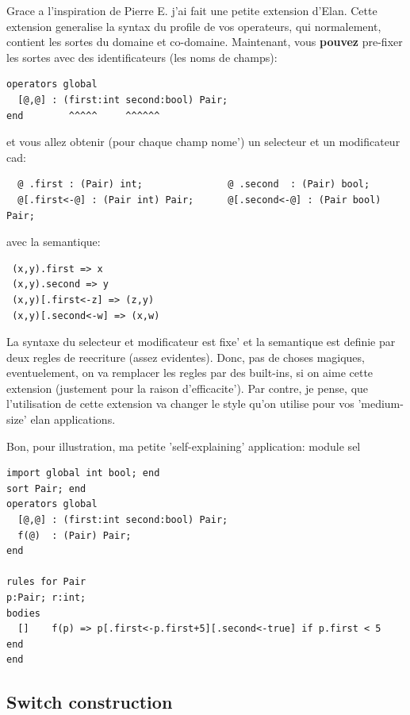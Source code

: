 \documentclass{article}
\begin{document}
{\scriptsize
Grace a l'inspiration de Pierre E. j'ai fait une petite extension d'Elan.
Cette extension generalise la syntax du profile de vos operateurs, qui
normalement, contient les sortes du domaine et co-domaine.
Maintenant, vous {\bf pouvez} pre-fixer les sortes avec des identificateurs
(les noms de champs):
\begin{verbatim}
operators global
  [@,@] : (first:int second:bool) Pair;
end        ^^^^^     ^^^^^^
\end{verbatim}
et vous allez obtenir (pour chaque champ nome') un selecteur et un modificateur
cad:
\begin{verbatim}
  @ .first : (Pair) int;               @ .second  : (Pair) bool;
  @[.first<-@] : (Pair int) Pair;      @[.second<-@] : (Pair bool) Pair;
\end{verbatim}
avec la semantique:
\begin{verbatim}
 (x,y).first => x              
 (x,y).second => y
 (x,y)[.first<-z] => (z,y)     
 (x,y)[.second<-w] => (x,w)
\end{verbatim}

La syntaxe du selecteur et modificateur est fixe' et la semantique
est definie par deux regles de reecriture (assez evidentes).
Donc, pas de choses magiques, eventuelement, on va remplacer les
regles par des built-ins, si on aime cette extension (justement pour
la raison d'efficacite').
Par contre, je pense, que l'utilisation de cette extension va changer
le style qu'on utilise pour vos 'medium-size' elan applications.

Bon, pour illustration, ma petite 'self-explaining' application:
module sel

\begin{verbatim}
import global int bool; end
sort Pair; end
operators global
  [@,@] : (first:int second:bool) Pair;
  f(@)  : (Pair) Pair;
end

rules for Pair
p:Pair; r:int;
bodies
  []    f(p) => p[.first<-p.first+5][.second<-true] if p.first < 5      end
end
\end{verbatim}
}
\subsection{Switch construction}
\end{document}
